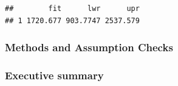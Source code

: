 \documentclass[]{article}
\begin{document}
\begin{verbatim}
##        fit      lwr      upr
## 1 1720.677 903.7747 2537.579
\end{verbatim}

\hypertarget{methods-and-assumption-checks}{%
\subsubsection{Methods and Assumption
Checks}\label{methods-and-assumption-checks}}

\hypertarget{executive-summary}{%
\subsubsection{Executive summary}\label{executive-summary}}
\end{document}
